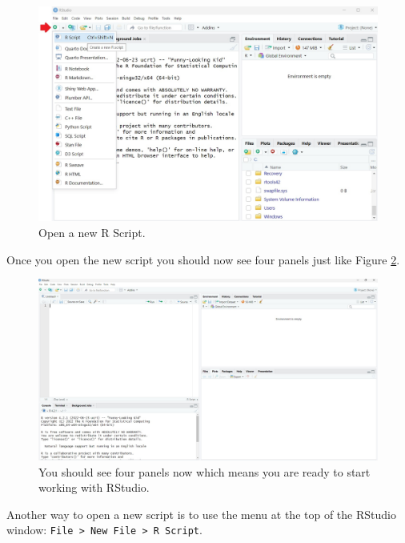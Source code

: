 \documentclass[
]{book}
\begin{document}
\begin{figure}

{\centering \includegraphics[width=1\linewidth]{images/rscript} 

}

\caption{Open a new R Script.}\label{fig:fig4}
\end{figure}

Once you open the new script you should now see four panels just like Figure \ref{fig:fig5}.

\begin{figure}

{\centering \includegraphics[width=1\linewidth]{images/rstudio2} 

}

\caption{You should see four panels now which means you are ready to start working with RStudio.}\label{fig:fig5}
\end{figure}

Another way to open a new script is to use the menu at the top of the RStudio window: \texttt{File\ \textgreater{}\ New\ File\ \textgreater{}\ R\ Script}.
\end{document}
